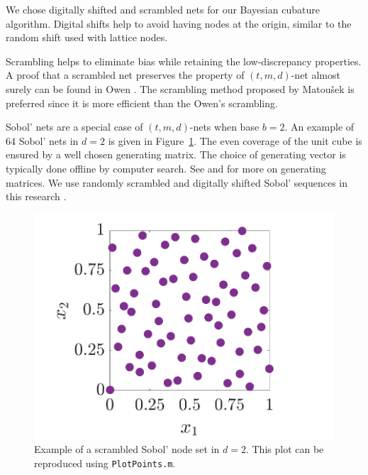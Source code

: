 \documentclass{svjour3}                     %
\newcommand{\bm}[1]{\boldsymbol{#1}}
\newcommand{\vx}{\bm{x}}
\newcommand{\vz}{\bm{z}}
\newcommand{\code}[1]{\texttt{#1}}
\newcommand\figref{Figure~\ref}
\newcommand{\JRNote}[1]{{\textcolor{green}{JR: #1}}}
\begin{document}
We chose digitally shifted and scrambled nets \cite{HicYue00} for our Bayesian cubature algorithm. Digital shifts help to avoid having nodes at the origin, similar to the random shift used with lattice nodes.

Scrambling helps to eliminate bias while retaining the low-discrepancy properties.
A proof that a scrambled net preserves the property of $(t, m, d)$-net almost surely can be found in Owen \cite{Owe95}. The scrambling method proposed by Matou\v{s}ek \cite{Mat98} is preferred since it is more efficient than the Owen's scrambling.

Sobol' nets \cite{Sob76} are a special case of $(t,m, d)$-nets when base $b=2$. 
An example of $64$ Sobol' nets in $d=2$ is given in \figref{fig:sobol-fig}.  The even coverage of the unit cube is ensured by a well chosen generating matrix.  The choice of generating vector is typically done offline by computer search.  See \cite{KuoNuyens2016} and \cite{NuySoft} for more on generating matrices. We use randomly scrambled and digitally shifted Sobol' sequences in this research \cite{HonHic00a}. 

\begin{figure}[htp]
	\centering
	\includegraphics[width=0.8\linewidth]{figures/SSobolPoints}
	\caption{Example of a scrambled Sobol' node set  in $d=2$.  This plot can be reproduced using \code{PlotPoints.m}. \label{sobolfig} }
	\label{fig:sobol-fig}
\end{figure}
\end{document}
